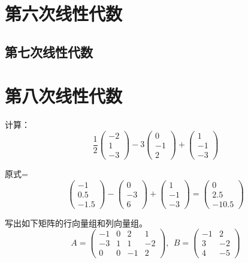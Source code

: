 \documentclass[a4paper]{report}
\begin{document}
\chapter{第六次线性代数}

\clearpage
\section{第七次线性代数}

\chapter{第八次线性代数}
\EX 计算：
\begin{equation*}
\frac{1}{2}
\begin{pmatrix}
-2\\ 1\\ -3
\end{pmatrix}-3
\begin{pmatrix}
0\\ -1\\ 2
\end{pmatrix}+
\begin{pmatrix}
1\\ -1\\ -3
\end{pmatrix}
\end{equation*}

\begin{jie}
原式=
\begin{equation*}
\begin{pmatrix}
-1\\ 0.5\\ -1.5
\end{pmatrix}-
\begin{pmatrix}
0\\ -3\\ 6
\end{pmatrix}+
\begin{pmatrix}
1\\ -1\\ -3
\end{pmatrix}=\begin{pmatrix}
0\\ 2.5\\ -10.5
\end{pmatrix}
\end{equation*}
\end{jie}

\EX 写出如下矩阵的行向量组和列向量组。
\begin{equation*}
A=
\begin{pmatrix}
-1 &0&2&1\\ -3& 1&1&-2\\ 0&0&-1&2
\end{pmatrix},~~B=
\begin{pmatrix}
-1&2\\ 3&-2\\ 4&-5
\end{pmatrix}
\end{equation*}
\end{document}
